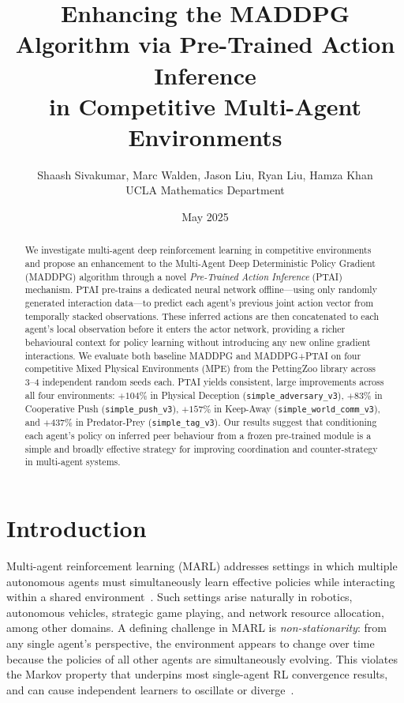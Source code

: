 \documentclass[12pt]{article}
\title{Enhancing the MADDPG Algorithm via Pre-Trained Action Inference\\
       in Competitive Multi-Agent Environments}
\author{Shaash Sivakumar, Marc Walden, Jason Liu, Ryan Liu, Hamza Khan\\
\small UCLA Mathematics Department}
\date{May 2025}
\begin{document}
\maketitle

\begin{abstract}
We investigate multi-agent deep reinforcement learning in competitive environments and
propose an enhancement to the Multi-Agent Deep Deterministic Policy Gradient (MADDPG)
algorithm through a novel \emph{Pre-Trained Action Inference} (PTAI) mechanism. PTAI
pre-trains a dedicated neural network offline---using only randomly generated interaction
data---to predict each agent's previous joint action vector from temporally stacked
observations. These inferred actions are then concatenated to each agent's local
observation before it enters the actor network, providing a richer behavioural context
for policy learning without introducing any new online gradient interactions. We evaluate
both baseline MADDPG and MADDPG+PTAI on four competitive Mixed Physical Environments
(MPE) from the PettingZoo library across 3--4 independent random seeds each. PTAI
yields consistent, large improvements across all four environments: $+104\%$ in Physical
Deception (\texttt{simple\_adversary\_v3}), $+83\%$ in Cooperative Push
(\texttt{simple\_push\_v3}), $+157\%$ in Keep-Away
(\texttt{simple\_world\_comm\_v3}), and $+437\%$ in Predator-Prey
(\texttt{simple\_tag\_v3}). Our results suggest that conditioning each agent's policy on
inferred peer behaviour from a frozen pre-trained module is a simple and broadly effective
strategy for improving coordination and counter-strategy in multi-agent systems.
\end{abstract}

\tableofcontents
\newpage

\section{Introduction}

Multi-agent reinforcement learning (MARL) addresses settings in which multiple autonomous
agents must simultaneously learn effective policies while interacting within a shared
environment~\cite{busoniu2008comprehensive}. Such settings arise naturally in robotics,
autonomous vehicles, strategic game playing, and network resource allocation, among other
domains. A defining challenge in MARL is \emph{non-stationarity}: from any single agent's
perspective, the environment appears to change over time because the policies of all other
agents are simultaneously evolving. This violates the Markov property that underpins most
single-agent RL convergence results, and can cause independent learners to oscillate or
diverge~\cite{tan1993multi}.
\end{document}
